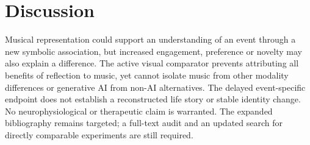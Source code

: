 \documentclass[11pt,a4paper]{article}
\begin{document}
\section{Discussion}
Musical representation could support an understanding of an event through a new symbolic association, but increased engagement, preference or novelty may also explain a difference. The active visual comparator prevents attributing all benefits of reflection to music, yet cannot isolate music from other modality differences or generative AI from non-AI alternatives. The delayed event-specific endpoint does not establish a reconstructed life story or stable identity change. No neurophysiological or therapeutic claim is warranted. The expanded bibliography remains targeted; a full-text audit and an updated search for directly comparable experiments are still required.

\printbibliography
\end{document}
